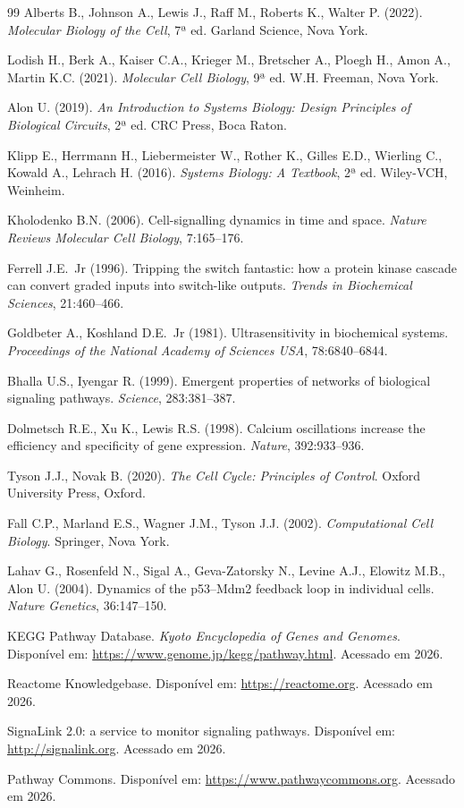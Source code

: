 \begin{thebibliography}{99}
 Alberts B., Johnson A., Lewis J., Raff M., Roberts K.,
Walter P. (2022). \textit{Molecular Biology of the Cell}, 7ª ed.
Garland Science, Nova York.

 Lodish H., Berk A., Kaiser C.A., Krieger M., Bretscher A.,
Ploegh H., Amon A., Martin K.C. (2021). \textit{Molecular Cell Biology},
9ª ed. W.H. Freeman, Nova York.

 Alon U. (2019). \textit{An Introduction to Systems Biology:
Design Principles of Biological Circuits}, 2ª ed. CRC Press, Boca Raton.

 Klipp E., Herrmann H., Liebermeister W., Rother K., Gilles
E.D., Wierling C., Kowald A., Lehrach H. (2016). \textit{Systems Biology: A
Textbook}, 2ª ed. Wiley-VCH, Weinheim.

 Kholodenko B.N. (2006). Cell-signalling dynamics in
time and space. \textit{Nature Reviews Molecular Cell Biology},
7:165--176.

 Ferrell J.E.\ Jr (1996). Tripping the switch fantastic:
how a protein kinase cascade can convert graded inputs into switch-like
outputs. \textit{Trends in Biochemical Sciences}, 21:460--466.

 Goldbeter A., Koshland D.E.\ Jr (1981). Ultrasensitivity
in biochemical systems. \textit{Proceedings of the National Academy of
Sciences USA}, 78:6840--6844.

 Bhalla U.S., Iyengar R. (1999). Emergent properties of
networks of biological signaling pathways. \textit{Science}, 283:381--387.

 Dolmetsch R.E., Xu K., Lewis R.S. (1998). Calcium
oscillations increase the efficiency and specificity of gene expression.
\textit{Nature}, 392:933--936.

 Tyson J.J., Novak B. (2020). \textit{The Cell Cycle:
Principles of Control}. Oxford University Press, Oxford.

 Fall C.P., Marland E.S., Wagner J.M., Tyson J.J. (2002).
\textit{Computational Cell Biology}. Springer, Nova York.

 Lahav G., Rosenfeld N., Sigal A., Geva-Zatorsky N., Levine
A.J., Elowitz M.B., Alon U. (2004). Dynamics of the p53--Mdm2 feedback
loop in individual cells. \textit{Nature Genetics}, 36:147--150.

 KEGG Pathway Database. \textit{Kyoto Encyclopedia of
Genes and Genomes}. Disponível em: \url{https://www.genome.jp/kegg/pathway.html}.
Acessado em 2026.

 Reactome Knowledgebase. Disponível em:
\url{https://reactome.org}. Acessado em 2026.

 SignaLink 2.0: a service to monitor signaling pathways.
Disponível em: \url{http://signalink.org}. Acessado em 2026.

 Pathway Commons. Disponível em:
\url{https://www.pathwaycommons.org}. Acessado em 2026.
\end{thebibliography}
